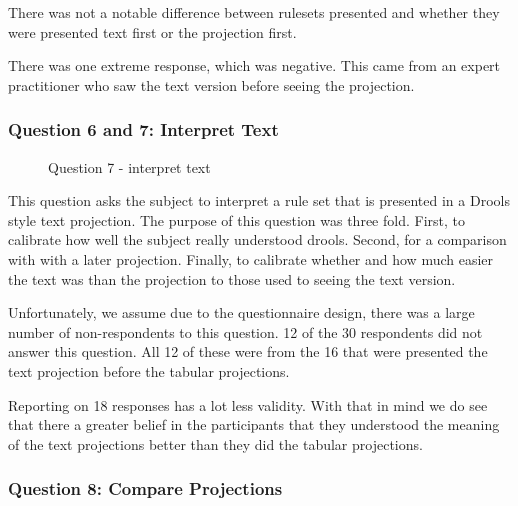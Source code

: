 There was not a notable difference between rulesets presented and whether they were presented text first or the projection first.

There was one extreme response, which was negative.
This came from an expert practitioner who saw the text version before seeing the projection.


\subsubsection{Question 6 and 7: Interpret Text}

\begin{figure}[H]
    \centering
    \caption{Question 7 - interpret text}
    \label{fig:stackedbar_Q3}
\end{figure}

This question asks the subject to interpret a rule set that is presented in a Drools style text projection.
The purpose of this question was three fold.
First, to calibrate how well the subject really understood drools.
Second, for a comparison with with a later projection.
Finally, to calibrate whether and how much easier the text was than the projection to those used to seeing the text version.

Unfortunately, we assume due to the questionnaire design, there was a large number of non-respondents to this question. 
12 of the 30 respondents did not answer this question.
All 12 of these were from the 16 that were presented the text projection before the tabular projections.

Reporting on 18 responses has a lot less validity.
With that in mind we do see that there a greater belief in the participants that they understood the meaning of the text projections better than they did the tabular projections.

\subsubsection{Question 8: Compare Projections}

